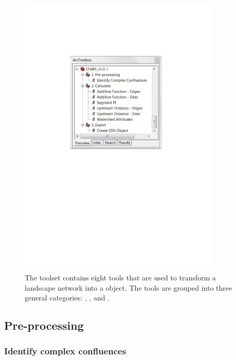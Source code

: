\documentclass[article]{jss}
\begin{document}
\begin{figure}[htbp]
  \begin{center}
    \includegraphics[width=275pt,keepaspectratio]{Figures/Fig3.pdf}
  \end{center}
  \caption{ The 
toolset contains eight tools that are used to transform a landscape
network into a  object. The tools are grouped into three general
categories: , , and . \label{Fig3}}
\end{figure}


\subsection{Pre-processing}

\subsubsection{Identify complex confluences}
\end{document}
